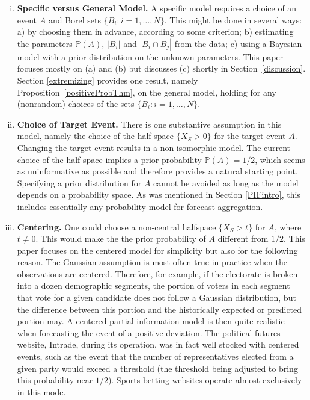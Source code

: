 \documentclass[11pt]{article}
\renewcommand{\P}{\mathbb{P}}
\theoremstyle{definition}
\theoremstyle{definition}
\def\P{{\mathbb P}}
\begin{document}
\begin{enumerate}[(i)]
\item {\bf Specific versus General Model.} A specific model 
requires a choice of an event $A$ and Borel sets $\{ B_i : i = 1, \dots, N\}$.  
This might be done in several ways:
a) by choosing them in advance, according to some criterion;
b) estimating the parameters $\P(A)$, $|B_i|$ and $|B_i \cap B_j|$
from the data; c) using a Bayesian model with a prior distribution on the unknown parameters.  
This paper focuses mostly on (a) and (b) but discusses (c) shortly in 
Section~\ref{discussion}.  Section \ref{extremizing} provides one result, namely 
Proposition~\ref{positiveProbThm}, on the general model, 
holding for any (nonrandom) choices of the sets $\{ B_i : i = 1, \dots, N\}$.
\label{item:specific}






\item {\bf Choice of Target Event.}  There is one substantive assumption 
in this model, namely the choice of the half-space $\{ X_S > 0 \}$ 
for the target event $A$.  Changing the target event results in a 
non-isomorphic model. The current choice of the half-space implies a prior probability $\P(A) = 1/2$, which seems as uninformative as possible and therefore provides a natural starting point. Specifying a prior distribution for $A$ cannot be avoided as long as the model depends on a probability space. As was mentioned in Section \ref{PIFintro}, this includes essentially any probability model for forecast aggregation.  

\item {\bf Centering.} One could choose a non-central halfspace 
$\{ X_S > t \}$ for $A$, where $t \neq 0$.  This would make the 
the prior probability of $A$ different from $1/2$.  This paper focuses on the 
centered model for simplicity but also for the following reason.  
The Gaussian assumption is most often true in practice when the 
observations are centered.  Therefore, for example, if the electorate 
is broken into a dozen demographic segments, the portion of voters 
in each segment that vote for a given candidate does not follow a 
Gaussian distribution, but the difference between this portion and 
the historically expected or predicted portion may.  A centered 
partial information model is then quite realistic when forecasting 
the event of a positive deviation.  The political futures website, Intrade, 
during its operation, was in fact well stocked with centered events, 
such as the event that the number of representatives elected from 
a given party would exceed a threshold (the threshold being adjusted 
to bring this probability near $1/2$).  Sports betting websites operate 
almost exclusively in this mode.
\label{item:centered}
\end{enumerate}
\end{document}
